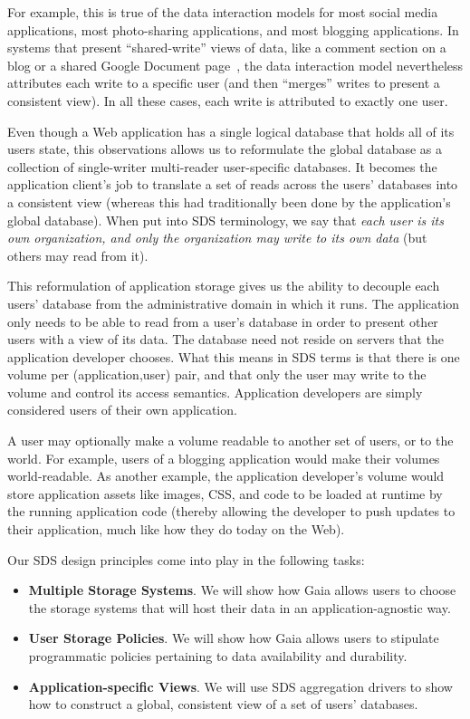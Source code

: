 For example, this is
true of the data interaction models for most social media applications,
most photo-sharing applications, and most blogging applications.  In systems
that present ``shared-write'' views of data, like a comment section on a blog or
a shared Google Document page~\cite{google-docs}, the data interaction model
nevertheless attributes each write to a specific user (and then ``merges''
writes to present a consistent view).  In all these cases, each write is
attributed to exactly one user.

Even though a Web application has a single logical database that holds all of
its users state, this observations allows us to reformulate
the global database as a collection of single-writer multi-reader user-specific
databases.  It becomes the application client's job to translate a set of reads across
the users' databases into a consistent view (whereas this had traditionally been
done by the application's global database).  When put into SDS terminology, we
say that \emph{each user is its own organization, and only the organization may write
to its own data} (but others may read from it).

This reformulation of application storage gives us the ability to decouple each
users' database from the administrative domain in which it runs.  The
application only needs to be able to read from a user's database in order to
present other users with a view of its data.  The database need not reside on
servers that the application developer chooses.  What this means in SDS terms is
that there is one volume per (application,user) pair, and that only the user may
write to the volume and control its access semantics.  Application developers
are simply considered users of their own application.

A user may optionally make a volume readable to another set of users, or to the
world.  For example, users of a blogging application would make their volumes
world-readable.  As another example, the application developer's volume would
store application assets like images, CSS, and code to be loaded at runtime by
the running application code (thereby allowing the developer to push
updates to their application, much like how they do today on the Web).

Our SDS design principles come into play in the following tasks:
\begin{itemize}
   \item \textbf{Multiple Storage Systems}.  We will show how Gaia allows users
      to choose the storage systems that will host their data in an
      application-agnostic way.
   \item \textbf{User Storage Policies}.  We will show how Gaia allows users to
      stipulate programmatic policies pertaining to data availability and durability.
   \item \textbf{Application-specific Views}.  We will use SDS aggregation
      drivers to show how to construct a
      global, consistent view of a set of users' databases.
\end{itemize}


